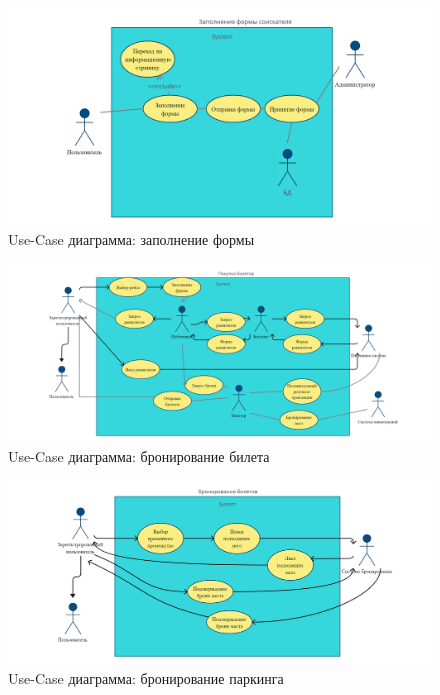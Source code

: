 \begin{figure}
      \includegraphics[width=16cm]{4-actions/Paper.jpg}
      \centering
      \caption{Use-Case диаграмма: заполнение формы}
\end{figure}

\begin{figure}
      \includegraphics[width=16cm]{4-actions/Book_tickets.jpg}
      \centering
      \caption{Use-Case диаграмма: бронирование билета}
\end{figure}

\begin{figure}
      \includegraphics[width=16cm]{4-actions/Book_parking.jpg}
      \centering
      \caption{Use-Case диаграмма: бронирование паркинга}
\end{figure}

